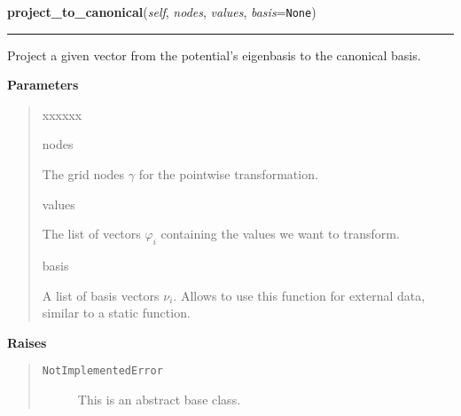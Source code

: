     \label{MatrixPotential:MatrixPotential:project_to_canonical}

    \vspace{0.5ex}

\hspace{.8\funcindent}\begin{boxedminipage}{\funcwidth}

    \raggedright \textbf{project\_to\_canonical}(\textit{self}, \textit{nodes}, \textit{values}, \textit{basis}={\tt None})

    \vspace{-1.5ex}

    \rule{\textwidth}{0.5\fboxrule}
\setlength{\parskip}{2ex}
    Project a given vector from the potential's eigenbasis to the canonical
    basis.

\setlength{\parskip}{1ex}
      \textbf{Parameters}
      \vspace{-1ex}

      \begin{quote}
        \begin{Ventry}{xxxxxx}

          \item[nodes]

          The grid nodes $\gamma$ for the pointwise
          transformation.

          \item[values]

          The list of vectors $\varphi_i$ containing the values we want
          to transform.

          \item[basis]

          A list of basis vectors $\nu_i$. Allows to use this function
          for external data, similar to a static function.

        \end{Ventry}

      \end{quote}

      \textbf{Raises}
    \vspace{-1ex}

      \begin{quote}
        \begin{description}

          \item[\texttt{NotImplementedError}]

          This is an abstract base class.

        \end{description}

      \end{quote}

    \end{boxedminipage}

